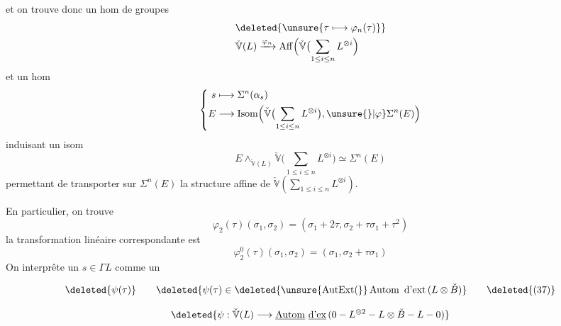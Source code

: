 
et on trouve donc un hom de groupes
\[
\begin{aligned}
&\deleted{\unsure{\tau\longmapsto\varphi_n(\tau)}}\\
&\check{\mathbb V}(L)\xrightarrow{\varphi_n}\operatorname{Aff}\Bigl(\check{\mathbb V}\bigl(\sum_{1\le i\le n}L^{\otimes i}
\Bigr)
\end{aligned}
\]
et un hom
\[
\left\{\begin{aligned}
s&\longmapsto\Sigma^n(\alpha_s)\\
E&\longrightarrow\operatorname{Isom}\Bigl(\check{\mathbb V}\bigl(\sum_{1\le i\le n}L^{\otimes i}\bigr),\unsure{\}|\varphi}\Sigma^n(E)\Bigr)
\end{aligned}\right.
\]
induisant un  isom
\[
 E\mathop{\wedge}_{\check{\mathbb V}(L)}\check{\mathbb V}\bigl(\sum_{1\le i\le n}L^{\otimes i}\bigr)
 \simeq\Sigma^n(E) \tag*{(34)}
\]
permettant de transporter sur $\Sigma^n(E)$ la
structure affine de $\check{\mathbb V}(\sum_{1\le i\le n}L^{\otimes i})$.

En particulier, on trouve
\[
\varphi_2(\tau)(\sigma_1,\sigma_2)=(\sigma_1+2\tau,\sigma_2+\tau\sigma_1+\tau^2) \tag*{(35)}
\]
la transformation linéaire  correspondante est
\[
\varphi_2^0(\tau)(\sigma_1,\sigma_2)=(\sigma_1,\sigma_2+\tau\sigma_1) \tag*{(36)}
\]
On  interprête un $s\in\Gamma L$ comme un



\[
\deleted{\psi(\tau)}\qquad
\deleted{\psi(\tau)\in\deleted{\unsure{\operatorname{AutExt}(}}\operatorname{Autom}\ \text{d'ext}\,(L\otimes\check B)}
\tag*{\deleted{(37)}}
\]


\[
\deleted{\psi:\check{\mathbb V}(L)\longrightarrow\underline{\operatorname{Autom}}\ \underline{\text{d'ex}}\,
(0\mathbin{-}L^{\otimes2}\mathbin{-}L\otimes\check B\mathbin{-}L\mathbin{-}0)}
\]

